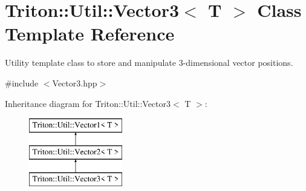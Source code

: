 \hypertarget{class_triton_1_1_util_1_1_vector3}{}\section{Triton\+:\+:Util\+:\+:Vector3$<$ T $>$ Class Template Reference}
\label{class_triton_1_1_util_1_1_vector3}


Utility template class to store and manipulate 3-\/dimensional vector positions.  




{\ttfamily \#include $<$Vector3.\+hpp$>$}

Inheritance diagram for Triton\+:\+:Util\+:\+:Vector3$<$ T $>$\+:\begin{figure}[H]
\begin{center}
\leavevmode
\includegraphics[height=3.000000cm]{class_triton_1_1_util_1_1_vector3}
\end{center}
\end{figure}
